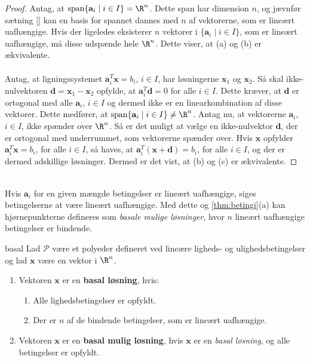 \begin{proof}
Antag, at $\text{span}\{\textbf{a}_i \mid i \in I\}= \R^n$.
Dette span har dimension $n$, og jævnfør sætning \ref{} %
kan en basis for spannet dannes med $n$ af vektorerne, som er lineært uafhængige.
%
Hvis der ligeledes eksisterer $n$ vektorer i $\{\textbf{a}_i \mid i \in I\}$, som er lineært uafhængige, må disse udspænde hele $\R^n$.
Dette viser, at (a) og (b) er ækvivalente.\\\\
%
Antag, at ligningssystemet $\textbf{a}^T_i\textbf{x}=b_i$, $i \in I$, har løsningerne $\textbf{x}_1$ og $\textbf{x}_2$.
Så skal ikke-nulvektoren $\textbf{d} = \textbf{x}_1 - \textbf{x}_2$ opfylde, at $\textbf{a}^T_i\textbf{d}=0$ for alle $i \in I$.
Dette kræver, at $\textbf{d}$ er ortogonal med alle $\textbf{a}_i$, $i \in I$ og dermed ikke er en linearkombination af disse vektorer.
Dette medfører, at $\text{span}\{\textbf{a}_i \mid i \in I\} \neq \R^n$.
%
Antag nu, at vektorerne $\textbf{a}_i$, $i \in I$, ikke spænder over $\R^n$.
Så er det muligt at vælge en ikke-nulvektor $\textbf{d}$, der er ortogonal med underrummet, som vektorerne spænder over.
Hvis $\textbf{x}$ opfylder  $\textbf{a}^T_i\textbf{x}= b_i$, for alle $i \in I$, så haves, at $\textbf{a}^T_i(\textbf{x}+\textbf{d})= b_i$, for alle $i \in I$, og der er dermed adskillige løsninger.
Dermed er det vist, at (b) og (c) er ækvivalente.
\end{proof}\\
%
Hvis $\textbf{a}_i$ for en given mængde betingelser er lineært uafhængige, siges betingelserne at være lineært uafhængige.
Med dette og \ref{thm:betingi}(a) kan hjørnepunkterne defineres som \textit{basale mulige løsninger}, hvor $n$ lineært uafhængige betingelser er bindende.
%
\begin{defn}{}{basal}
Lad $\mathcal{P}$ være et polyeder defineret ved lineære ligheds- og ulighedsbetingelser og lad $\textbf{x}$ være en vektor i $\R^n$.
%
\begin{enumerate}[label=(\alph*)]
\item Vektoren $\textbf{x}$ er en \textbf{basal løsning}, hvis:
%
\begin{enumerate}[label=(\roman*)]
\item Alle lighedsbetingelser er opfyldt.
\item Der er $n$ af de bindende betingelser, som er lineært uafhængige.
\end{enumerate}
%
\item Vektoren $\textbf{x}$ er en \textbf{basal mulig løsning}, hvis $\textbf{x}$ er en \textit{basal løsning}, og alle betingelser er opfyldt.
\end{enumerate}
\end{defn}\noindent
